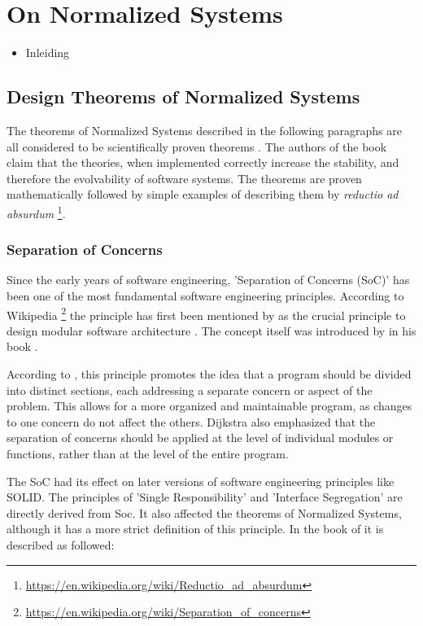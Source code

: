 \section{On Normalized Systems} 
\label{ns_theory}
\begin{itemize}
    \item Inleiding
\end{itemize}


\subsection{Design Theorems of Normalized Systems} \label{subsec:ns_desing_theorems}

The theorems of Normalized Systems described in the following paragraphs are all
considered to be scientifically proven theorems \parencite{mannaert_normalized_2016}. The
authors of the book claim that the theories, when implemented correctly increase
the stability, and therefore the evolvability of software systems. The theorems are proven
mathematically followed by simple examples of describing them by \textit{reductio ad absurdum} 
\footnote{\url{https://en.wikipedia.org/wiki/Reductio_ad_absurdum}}.

\subsubsection{Separation of Concerns}
Since the early years of software engineering, 'Separation of Concerns (SoC)' has been one
of the most fundamental software engineering principles. According to Wikipedia
\footnote{\url{https://en.wikipedia.org/wiki/Separation_of_concerns}} the principle has
first been mentioned by \citeauthor{dijkstra_selected_1982} as the crucial principle to
design modular software architecture \parencite[]{dijkstra_selected_1982}. The concept
itself was introduced by \citeauthor{parnas_criteria_1972} in his book
.

According to \citeauthor{dijkstra_selected_1982}, this principle promotes the idea that a
program should be divided into distinct sections, each addressing a separate concern or
aspect of the problem. This allows for a more organized and maintainable program, as
changes to one concern do not affect the others. Dijkstra also emphasized that the
separation of concerns should be applied at the level of individual modules or functions,
rather than at the level of the entire program.

The SoC had its effect on later versions of software engineering principles like SOLID.
The principles of 'Single Responsibility' and 'Interface Segregation' are directly derived
from Soc. It also affected the theorems of Normalized Systems, although it has a more
strict definition of this principle. In the book of \citeauthor{mannaert_normalized_2016}
it is described as followed: 

